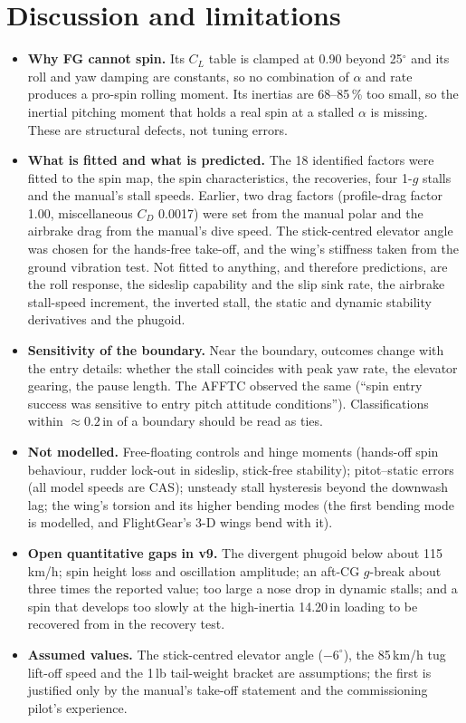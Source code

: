 \documentclass[10pt,a4paper,twocolumn]{article}
\newcommand{\vnine}{v9}
\newcommand{\FG}{FG}
\begin{document}
\section{Discussion and limitations}
\begin{itemize}
\item \textbf{Why \FG{} cannot spin.} Its $C_L$ table is clamped at 0.90 beyond 25$^\circ$ and its roll and yaw damping are constants,
so no combination of $\alpha$ and rate produces a pro-spin rolling moment. Its inertias are 68--85\,\% too small, so the
inertial pitching moment that holds a real spin at a stalled $\alpha$ is missing. These are structural defects, not tuning errors.
\item \textbf{What is fitted and what is predicted.} The 18 identified factors were fitted to the spin map, the spin characteristics,
the recoveries, four 1-$g$ stalls and the manual's stall speeds. Earlier, two drag factors (profile-drag factor 1.00, miscellaneous
$C_D$ 0.0017) were set from the manual polar and the airbrake drag from the manual's dive speed. The stick-centred elevator angle was
chosen for the hands-free take-off, and the wing's stiffness taken from the ground vibration test. Not fitted to anything, and therefore predictions, are the roll response, the sideslip
capability and the slip sink rate, the airbrake stall-speed increment, the inverted stall, the static and dynamic stability
derivatives and the phugoid.
\item \textbf{Sensitivity of the boundary.} Near the boundary, outcomes change with the entry details: whether the stall coincides with
peak yaw rate, the elevator gearing, the pause length. The AFFTC observed the same (``spin entry success was sensitive to entry pitch
attitude conditions''). Classifications within $\approx0.2$\,in of a boundary should be read as ties.
\item \textbf{Not modelled.} Free-floating controls and hinge moments (hands-off spin behaviour, rudder lock-out in sideslip,
stick-free stability); pitot--static errors (all model speeds are CAS); unsteady stall hysteresis beyond the downwash lag; the
wing's torsion and its higher bending modes (the first bending mode is modelled, and FlightGear's 3-D wings bend with it).
\item \textbf{Open quantitative gaps in \vnine.} The divergent phugoid below about 115\,km/h; spin height loss and oscillation amplitude;
an aft-CG $g$-break about three times the reported value; too large a nose drop in dynamic stalls; and a spin that develops too slowly at
the high-inertia 14.20\,in loading to be recovered from in the recovery test.
\item \textbf{Assumed values.} The stick-centred elevator angle ($-6^\circ$), the 85\,km/h tug lift-off speed and the 1\,lb tail-weight bracket
are assumptions; the first is justified only by the manual's take-off statement and the commissioning pilot's experience.
\end{itemize}
\end{document}

